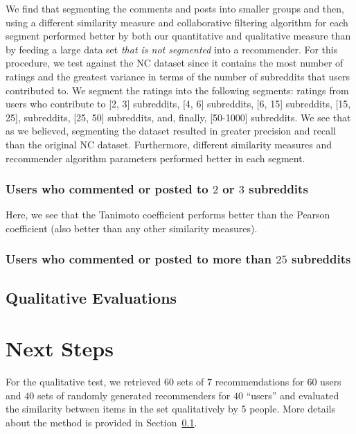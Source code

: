 \documentclass{article}
\begin{document}
We find that segmenting the comments and posts into smaller groups and then, using a different similarity measure
and collaborative filtering algorithm for each segment performed better by both our quantitative and qualitative
measure than by feeding a large data set \emph{that is not segmented} into a recommender. For this procedure, 
we test against the NC dataset since it contains the most number of ratings and the greatest variance
in terms of the number of subreddits that users contributed to. We segment the ratings into the following segments: 
ratings from users who contribute to [2, 3] subreddits, [4, 6] subreddits, [6, 15] subreddits, [15, 25], subreddits, [25, 50] 
subreddits, and, finally, [50-1000] subreddits. We see that as we believed, segmenting the dataset
resulted in greater precision and recall than the original NC dataset. Furthermore, different similarity 
measures and recommender algorithm parameters performed better in each segment. 

\subsubsection{Users who commented or posted to $2$ or $3$ subreddits}\label{2-3-users}

Here, we see that the Tanimoto coefficient performs better than the Pearson coefficient (also 
better than any other similarity measures). 

\subsubsection{Users who commented or posted to more than $25$ subreddits}\label{more-than-25}

\subsection{Qualitative Evaluations}\label{sec:qualitative-evaluations}

\section{Next Steps}

For the qualitative test, we retrieved $60$ sets of $7$ recommendations for $60$ users and $40$ sets of randomly
generated recommenders for $40$ ``users'' and evaluated the similarity between items in the set qualitatively by 5 
people. More details about the method is provided in Section~\ref{sec:qualitative-evaluations}. 
\end{document}
